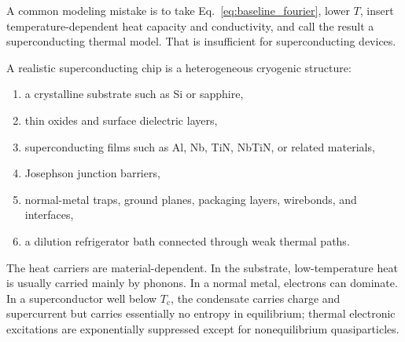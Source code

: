 \documentclass[11pt]{article}
\newcommand{\Tc}{T_{\mathrm{c}}}
\begin{document}
A common modeling mistake is to take Eq.~\eqref{eq:baseline_fourier}, lower \(T\), insert temperature-dependent heat capacity and conductivity, and call the result a superconducting thermal model. That is insufficient for superconducting devices.

A realistic superconducting chip is a heterogeneous cryogenic structure:
\begin{enumerate}[label=\arabic*.]
\item a crystalline substrate such as Si or sapphire,
\item thin oxides and surface dielectric layers,
\item superconducting films such as Al, Nb, TiN, NbTiN, or related materials,
\item Josephson junction barriers,
\item normal-metal traps, ground planes, packaging layers, wirebonds, and interfaces,
\item a dilution refrigerator bath connected through weak thermal paths.
\end{enumerate}
The heat carriers are material-dependent. In the substrate, low-temperature heat is usually carried mainly by phonons. In a normal metal, electrons can dominate. In a superconductor well below \(\Tc\), the condensate carries charge and supercurrent but carries essentially no entropy in equilibrium; thermal electronic excitations are exponentially suppressed except for nonequilibrium quasiparticles.
\end{document}
